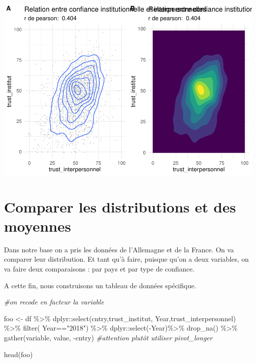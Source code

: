 \documentclass[
]{book}
\newenvironment{Shaded}{\begin{snugshade}}{\end{snugshade}}
\newcommand{\CommentTok}[1]{\textcolor[rgb]{0.56,0.35,0.01}{\textit{#1}}}
\newcommand{\FunctionTok}[1]{\textcolor[rgb]{0.00,0.00,0.00}{#1}}
\newcommand{\NormalTok}[1]{#1}
\newcommand{\OtherTok}[1]{\textcolor[rgb]{0.56,0.35,0.01}{#1}}
\newcommand{\SpecialCharTok}[1]{\textcolor[rgb]{0.00,0.00,0.00}{#1}}
\newcommand{\StringTok}[1]{\textcolor[rgb]{0.31,0.60,0.02}{#1}}
\begin{document}
\includegraphics{bookdown-demo_files/figure-latex/416-1.pdf}

\hypertarget{comparer-les-distributions-et-des-moyennes}{%
\section{Comparer les distributions et des moyennes}\label{comparer-les-distributions-et-des-moyennes}}

Dans notre base on a pris les données de l'Allemagne et de la France. On va comparer leur distribution. Et tant qu'à faire, puisque qu'on a deux variables, on va faire deux comparaisons : par pays et par type de confiance.

A cette fin, nous construisons un tableau de données spécifique.

\begin{Shaded}
\begin{Highlighting}[]
\CommentTok{\#on recode en facteur la variable}

\NormalTok{foo }\OtherTok{\textless{}{-}}\NormalTok{ df }\SpecialCharTok{\%\textgreater{}\%} 
\NormalTok{  dplyr}\SpecialCharTok{::}\FunctionTok{select}\NormalTok{(cntry,trust\_institut, Year,trust\_interpersonnel) }\SpecialCharTok{\%\textgreater{}\%}
  \FunctionTok{filter}\NormalTok{( Year}\SpecialCharTok{==}\StringTok{"2018"}\NormalTok{) }\SpecialCharTok{\%\textgreater{}\%} 
\NormalTok{ dplyr}\SpecialCharTok{::}\FunctionTok{select}\NormalTok{(}\SpecialCharTok{{-}}\NormalTok{Year)}\SpecialCharTok{\%\textgreater{}\%}
 \FunctionTok{drop\_na}\NormalTok{() }\SpecialCharTok{\%\textgreater{}\%}
  \FunctionTok{gather}\NormalTok{(variable, value, }\SpecialCharTok{{-}}\NormalTok{cntry) }\CommentTok{\#attention plutôt utiliser pivot\_longer}

\FunctionTok{head}\NormalTok{(foo)}
\end{Highlighting}
\end{Shaded}
\end{document}
